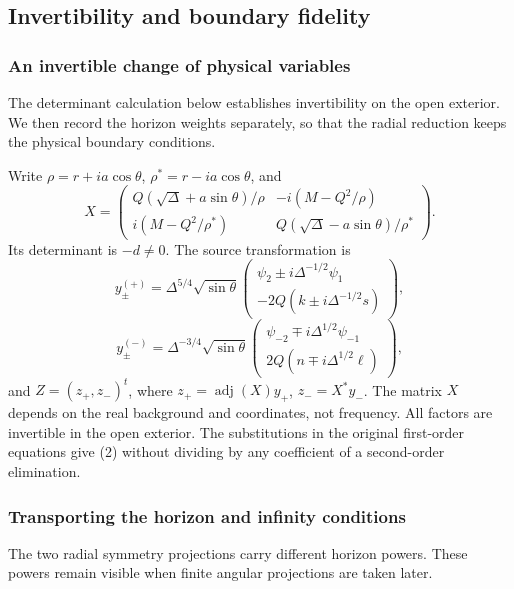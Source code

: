 \documentclass[11pt,a4paper]{article}
\begin{document}
\subsection{Invertibility and boundary
fidelity}\label{invertibility-and-boundary-fidelity}

\subsubsection{An invertible change of physical variables}\label{readable-invertibility}

The determinant calculation below establishes invertibility on the open exterior. We then record the horizon weights separately, so that the radial reduction keeps the physical boundary conditions.

Write \(\rho=r+ia\cos\theta\), \(\rho^*=r-ia\cos\theta\), and \[
 X=\begin{pmatrix}
 Q(\sqrt\Delta+a\sin\theta)/\rho&-i(M-Q^2/\rho)\\
 i(M-Q^2/\rho^*)&Q(\sqrt\Delta-a\sin\theta)/\rho^*
 \end{pmatrix}.
 \tag{6}
\] Its determinant is \(-d\ne0\). The source transformation is \[
 y_\pm^{(+)}=\Delta^{5/4}\sqrt{\sin\theta}
 \begin{pmatrix}\psi_2\pm i\Delta^{-1/2}\psi_1\\
 -2Q(k\pm i\Delta^{-1/2}s)\end{pmatrix},
\] \[
 y_\pm^{(-)}=\Delta^{-3/4}\sqrt{\sin\theta}
 \begin{pmatrix}\psi_{-2}\mp i\Delta^{1/2}\psi_{-1}\\
 2Q(n\mp i\Delta^{1/2}\ell)\end{pmatrix},
\] and \(Z=(z_+,z_-)^t\), where \(z_+=\operatorname{adj}(X)y_+\),
\(z_-=X^*y_-\). The matrix \(X\) depends on the real background and
coordinates, not frequency. All factors are invertible in the open
exterior. The substitutions in the original first-order equations give
(2) without dividing by any coefficient of a second-order elimination.

\subsubsection{Transporting the horizon and infinity conditions}\label{readable-boundary-weights}

The two radial symmetry projections carry different horizon powers. These powers remain visible when finite angular projections are taken later.
\end{document}
